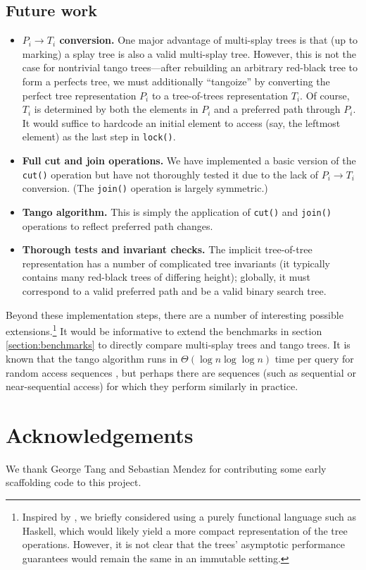 \documentclass{article}
\begin{document}
\subsection{Future work}
\begin{itemize}
    \item \textbf{$P_i \to T_i$ conversion.} One major advantage of multi-splay trees is that (up to marking) a splay tree is also a valid multi-splay tree. However, this is not the case for nontrivial tango trees---after rebuilding an arbitrary red-black tree to form a perfects tree, we must additionally ``tangoize'' by converting the perfect tree representation $P_i$ to a tree-of-trees representation $T_i$. Of course, $T_i$ is determined by both the elements in $P_i$ and a preferred path through $P_i$. It would suffice to hardcode an initial element to access (say, the leftmost element) as the last step in \texttt{lock()}.
    \item \textbf{Full cut and join operations.} We have implemented a basic version of the \texttt{cut()} operation but have not thoroughly tested it due to the lack of $P_i \to T_i$ conversion. (The \texttt{join()} operation is largely symmetric.)
    \item \textbf{Tango algorithm.} This is simply the application of \texttt{cut()} and \texttt{join()} operations to reflect preferred path changes.
    \item \textbf{Thorough tests and invariant checks.} The implicit tree-of-tree representation has a number of complicated tree invariants (it typically contains many red-black trees of differing height); globally, it must correspond to a valid preferred path and be a valid binary search tree.
\end{itemize}

Beyond these implementation steps, there are a number of interesting possible extensions.\footnote{Inspired by \cite{okasaki1999purely}, we briefly considered using a purely functional language such as Haskell, which would likely yield a more compact representation of the tree operations. However, it is not clear that the trees' asymptotic performance guarantees would remain the same in an immutable setting.} It would be informative to extend the benchmarks in section \ref{section:benchmarks} to directly compare multi-splay trees and tango trees. It is known that the tango algorithm runs in $\Theta(\log n \log \log n)$ time per query for random access sequences \cite{daniel2006log}, but perhaps there are sequences (such as sequential or near-sequential access) for which they perform similarly in practice. 


\section*{Acknowledgements}
We thank George Tang and Sebastian Mendez for contributing some early scaffolding code to this project.



\newpage
\printbibliography


\end{document}
